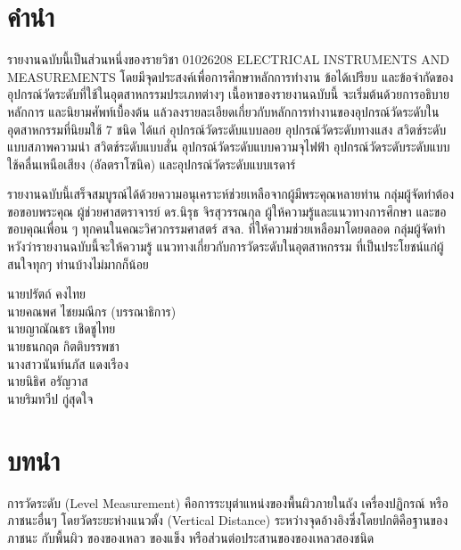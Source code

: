 \documentclass[final,11pt]{article}
\begin{document}
\section*{คำนำ}
รายงานฉบับนี้เป็นส่วนหนึ่งของรายวิชา 01026208 ELECTRICAL INSTRUMENTS AND MEASUREMENTS 
โดยมีจุดประสงค์เพื่อการศึกษาหลักการทำงาน ข้อได้เปรียบ และข้อจำกัดของอุปกรณ์วัดระดับที่ใช้ในอุตสาหกรรมประเภทต่างๆ 
เนื้อหาของรายงานฉบับนี้ จะเริ่มต้นด้วยการอธิบายหลักการ และนิยามศัพท์เบื้องต้น แล้วลงรายละเอียดเกี่ยวกับหลักการทำงานของอุปกรณ์วัดระดับในอุตสาหกรรมที่นิยมใช้
7 ชนิด ได้แก่ อุปกรณ์วัดระดับแบบลอย อุปกรณ์วัดระดับทางแสง สวิตช์ระดับแบบสภาพความนำ สวิตช์ระดับแบบสั่น อุปกรณ์วัดระดับแบบความจุไฟฟ้า 
อุปกรณ์วัดระดับระดับแบบใช้คลื่นเหนือเสียง (อัลตราโซนิค) และอุปกรณ์วัดระดับแบบเรดาร์

รายงานฉบับนี้เสร็จสมบูรณ์ได้ด้วยความอนุเคราะห์ช่วยเหลือจากผู้มีพระคุณหลายท่าน กลุ่มผู้จัดทำต้องขอขอบพระคุณ 
ผู้ช่วยศาสตราจารย์ ดร.นิรุธ จิรสุวรรณกุล ผู้ให้ความรู้และแนวทางการศึกษา และขอขอบคุณเพื่อน ๆ ทุกคนในคณะวิศวกรรมศาสตร์ สจล. ที่ให้ความช่วยเหลือมาโดยตลอด 
กลุ่มผู้จัดทำหวังว่ารายงานฉบับนี้จะให้ความรู้ แนวทางเกี่ยวกับการวัดระดับในอุตสาหกรรม ที่เป็นประโยชน์แก่ผู้สนใจทุกๆ ท่านบ้างไม่มากก็น้อย

\vspace{1cm}
\hspace{9cm}
\vbox{\noindent
    นายปรัตถ์ คงไทย\\
    นายคณพศ ไชยมณีกร (บรรณาธิการ)\\
    นายญาณัณธร เชิดชูไทย\\
    นายธนกฤต กิตติบรรพชา\\
    นางสาวนันท์นภัส แดงเรือง\\
    นายนิธิศ อรัญวาส\\
    นายริมทวีป กู่สุดใจ\\

}
\newpage
\renewcommand\contentsname{สารบัญ}
\tableofcontents
\newpage
\section{บทนำ}
การวัดระดับ (Level Measurement) คือการระบุตำแหน่งของพื้นผิวภายในถัง เครื่องปฏิกรณ์
หรือภาชนะอื่นๆ โดยวัดระยะห่างแนวตั้ง (Vertical Distance) ระหว่างจุดอ้างอิงซึ่งโดยปกติคือฐานของภาชนะ กับพื้นผิว
ของของเหลว ของแข็ง หรือส่วนต่อประสานของของเหลวสองชนิด
\end{document}
